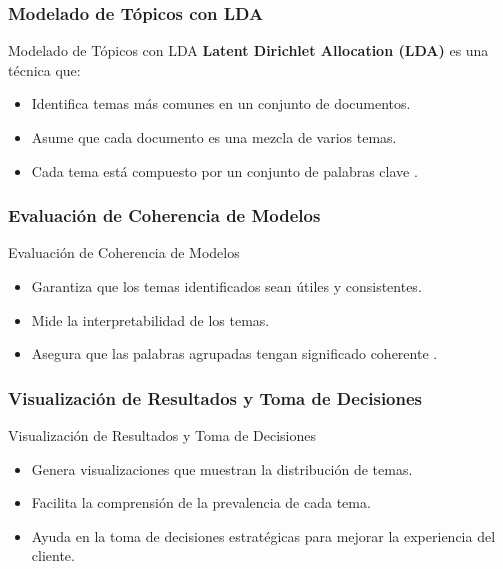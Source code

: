 \documentclass[aspectratio=169, xcolor={dvipsnames}, 10pt, spanish]{beamer}
\begin{document}
\subsubsection{Modelado de Tópicos con LDA}
\begin{frame}{Modelado de Tópicos con LDA}
    \textbf{Latent Dirichlet Allocation (LDA)} es una técnica que:

    \begin{itemize}
        \item Identifica temas más comunes en un conjunto de documentos.
        \item Asume que cada documento es una mezcla de varios temas.
        \item Cada tema está compuesto por un conjunto de palabras clave \cite{9}.
    \end{itemize}
\end{frame}

\subsubsection{Evaluación de Coherencia de Modelos}
\begin{frame}{Evaluación de Coherencia de Modelos}
    \begin{itemize}
        \item Garantiza que los temas identificados sean útiles y consistentes.
        \item Mide la interpretabilidad de los temas.
        \item Asegura que las palabras agrupadas tengan significado coherente \cite{10}.
    \end{itemize}
\end{frame}

\subsubsection{Visualización de Resultados y Toma de Decisiones}
\begin{frame}{Visualización de Resultados y Toma de Decisiones}
    \begin{itemize}
        \item Genera visualizaciones que muestran la distribución de temas.
        \item Facilita la comprensión de la prevalencia de cada tema.
        \item Ayuda en la toma de decisiones estratégicas para mejorar la experiencia del cliente.
    \end{itemize}
\end{frame}
\end{document}
